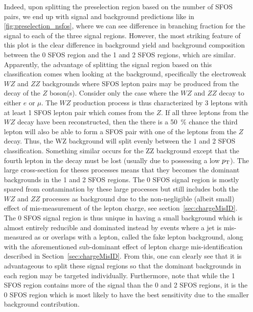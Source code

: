 Indeed, upon splitting the preselection region based on the number of SFOS
pairs, we end up with signal and background predictions like in 
\fig\ref{fig:preselection_nsfos}, where we can see difference
in branching fraction for the signal to each of the three signal regions.
However, the most striking feature of this plot is the 
clear difference in background yield and background composition
between the 0 SFOS region and the 1 and 2 SFOS regions, which are similar.
Apparently, the advantage of splitting the signal region based on this
classification comes when looking at the background, specifically the
electroweak $WZ$ and $ZZ$ backgrounds where SFOS lepton pairs may be
produced from the decay of the $Z$ boson(s). Consider only the case
where the $WZ$ and $ZZ$ decay to either $e$ or $\mu$.  The $WZ$ production
process is thus characterized by 3 leptons with at least 1 SFOS lepton pair
which comes from the $Z$. If all three leptons from the $WZ$ decay have been
reconstructed, then the there is a 50~\% chance the third lepton 
will also be able to form a SFOS pair with one of the leptons from the $Z$ decay.
Thus, the WZ background will split evenly between the 1 and 2 SFOS classification.
Something similar occurs for the ZZ background except that the fourth lepton 
in the decay must be lost (usually due to possessing a low $p_{\mathrm{T}}$).
The large cross-section for theses processes means that
they becomes the dominant backgrounds in the 1 and 2 SFOS regions.  
The 0 SFOS signal region is mostly spared from contamination  by 
these large processes but still
includes both the $WZ$ and $ZZ$ processes as background due to the
non-negligible (albeit small) effect of mis-measurement of the lepton
charge, see section~\ref{sec:chargeMisID}.  The 0 SFOS signal region
is thus unique in having a small background which is almost entirely
reducible and dominated instead by events where a jet is mis-measured
as or overlaps with a lepton, called the fake lepton background, along
with the aforementioned sub-dominant effect of lepton charge 
mis-identification described in Section~\ref{sec:chargeMisID}.  
From this, one can clearly see that it is
advantageous to split these signal regions so that the dominant
backgrounds in each region may be targeted individually.  Furthermore,
note that while the 1 SFOS region contains more of the signal than the
0 and 2 SFOS regions, it is the 0 SFOS region which is most likely to
have the best sensitivity due to the smaller background contribution.


